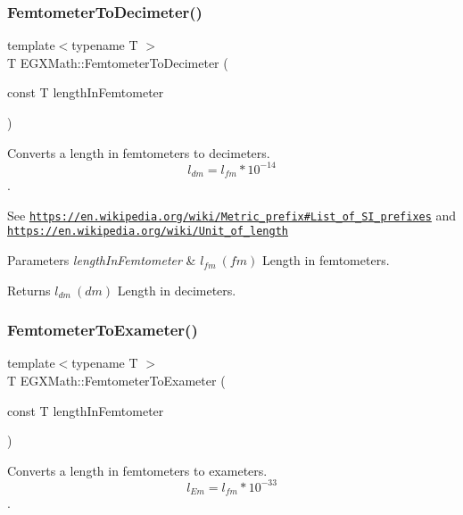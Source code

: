 \subsubsection{\texorpdfstring{Femtometer\+To\+Decimeter()}{FemtometerToDecimeter()}}
{\footnotesize\ttfamily template$<$typename T $>$ \\
T E\+G\+X\+Math\+::\+Femtometer\+To\+Decimeter (\begin{DoxyParamCaption}\item[{const T}]{length\+In\+Femtometer }\end{DoxyParamCaption})}



Converts a length in femtometers to decimeters. \[ l_{dm}=l_{fm} * 10^{-14} \]. 

See \href{https://en.wikipedia.org/wiki/Metric_prefix#List_of_SI_prefixes}{\tt https\+://en.\+wikipedia.\+org/wiki/\+Metric\+\_\+prefix\#\+List\+\_\+of\+\_\+\+S\+I\+\_\+prefixes} and \href{https://en.wikipedia.org/wiki/Unit_of_length}{\tt https\+://en.\+wikipedia.\+org/wiki/\+Unit\+\_\+of\+\_\+length} 
\begin{DoxyParams}{Parameters}
{\em length\+In\+Femtometer} & $ l_{fm}\ (fm)$ Length in femtometers. \\
\hline
\end{DoxyParams}
\begin{DoxyReturn}{Returns}
$ l_{dm}\ (dm)$ Length in decimeters. 
\end{DoxyReturn}
\mbox{\label{group___e_g_x_math-_conversions-_length_conversions-_femtometer-_s_i_ga44f78ba3f928c765acf6330b47ab3827}} 
\subsubsection{\texorpdfstring{Femtometer\+To\+Exameter()}{FemtometerToExameter()}}
{\footnotesize\ttfamily template$<$typename T $>$ \\
T E\+G\+X\+Math\+::\+Femtometer\+To\+Exameter (\begin{DoxyParamCaption}\item[{const T}]{length\+In\+Femtometer }\end{DoxyParamCaption})}



Converts a length in femtometers to exameters. \[ l_{Em}=l_{fm} * 10^{-33} \]. 

